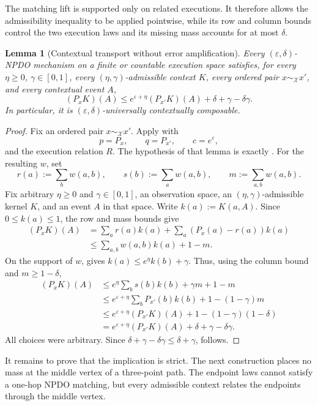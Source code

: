 \documentclass[11pt]{article}
\newtheorem{lemma}{Lemma}[section]
\begin{document}
The matching lift is supported only on related executions.  It therefore
allows the admissibility inequality to be applied pointwise, while its row and
column bounds control the two execution laws and its missing mass accounts for
at most $\delta$.

\begin{lemma}[Contextual transport without error amplification]
\label{lem:transport}
Every $(\varepsilon,\delta)$-NPDO mechanism on a finite or countable execution
space satisfies, for every $\eta\geq0$, $\gamma\in[0,1]$, every
$(\eta,\gamma)$-admissible context $K$, every ordered pair
$x\sim_{\mathcal X}x'$, and every contextual event $A$,
\[
 (P_xK)(A)\leq e^{\varepsilon+\eta}(P_{x'}K)(A)
 +\delta+\gamma-\delta\gamma.
\]
In particular, it is $(\varepsilon,\delta)$-universally contextually
composable.
\end{lemma}

\begin{proof}
Fix an ordered pair $x\sim_{\mathcal X}x'$.  Apply  with
\[
 p=P_x,\qquad q=P_{x'},\qquad c=e^\varepsilon,
\]
and the execution relation $R$.  The hypothesis of that lemma is exactly
.  For the resulting $w$, set
\[
 r(a):=\sum_b w(a,b),\qquad
 s(b):=\sum_a w(a,b),\qquad
 m:=\sum_{a,b}w(a,b).
\]
Fix arbitrary $\eta\geq0$ and $\gamma\in[0,1]$, an observation space, an
$(\eta,\gamma)$-admissible kernel $K$, and an event $A$ in that space.  Write
$k(a):=K(a,A)$.  Since $0\leq k(a)\leq1$, the row and mass bounds give
\begin{align*}
 (P_xK)(A)
 &=\sum_a r(a)k(a)+\sum_a(P_x(a)-r(a))k(a)\\
 &\leq\sum_{a,b}w(a,b)k(a)+1-m.
\end{align*}
On the support of $w$,  gives
$k(a)\leq e^\eta k(b)+\gamma$.  Thus, using the column bound and
$m\geq1-\delta$,
\begin{align*}
 (P_xK)(A)
 &\leq e^\eta\sum_b s(b)k(b)+\gamma m+1-m\\
 &\leq e^{\varepsilon+\eta}\sum_bP_{x'}(b)k(b)+1-(1-\gamma)m\\
 &\leq e^{\varepsilon+\eta}(P_{x'}K)(A)
       +1-(1-\gamma)(1-\delta)\\
 &=e^{\varepsilon+\eta}(P_{x'}K)(A)
       +\delta+\gamma-\delta\gamma.
\end{align*}
All choices were arbitrary.  Since $\delta+\gamma-\delta\gamma\leq
\delta+\gamma$,  follows.
\end{proof}

It remains to prove that the implication is strict.  The next construction
places no mass at the middle vertex of a three-point path.  The endpoint laws
cannot satisfy a one-hop NPDO matching, but every admissible context relates
the endpoints through the middle vertex.
\end{document}
